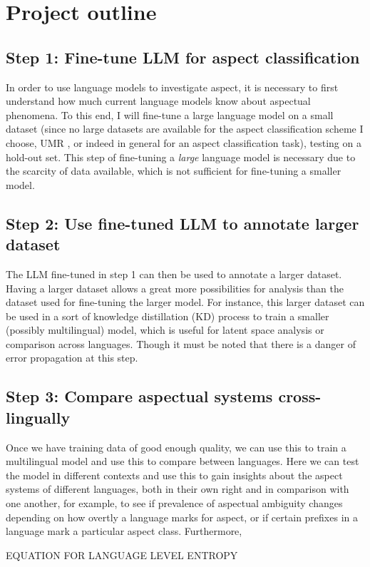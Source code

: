 \section{Project outline}
\subsection*{Step 1: Fine-tune LLM for aspect classification}
In order to use language models to investigate aspect, it is necessary to first understand how much current language models know about aspectual phenomena. To this end, I will fine-tune a large language model on a small dataset (since no large datasets are available for the aspect classification scheme I choose, UMR \citep{umr}, or indeed in general for an aspect classification task), testing on a hold-out set. This step of fine-tuning a \emph{large} language model is necessary due to the scarcity of data available, which is not sufficient for fine-tuning a smaller model.
\subsection*{Step 2: Use fine-tuned LLM to annotate larger dataset}
The LLM fine-tuned in step 1 can then be used to annotate a larger dataset. Having a larger dataset allows a great more possibilities for analysis than the dataset used for fine-tuning the larger model. For instance, this larger dataset can be used in a sort of knowledge distillation (KD) process to train a smaller (possibly multilingual) model, which is useful for latent space analysis or comparison across languages. Though it must be noted that there is a danger of error propagation at this step.
\subsection*{Step 3: Compare aspectual systems cross-lingually}
Once we have training data of good enough quality, we can use this to train a multilingual model and use this to compare between languages. Here we can test the model in different contexts and use this to gain insights about the aspect systems of different languages, both in their own right and in comparison with one another, for example, to see if prevalence of aspectual ambiguity changes depending on how overtly a language marks for aspect, or if certain prefixes in a language mark a particular aspect class. Furthermore, 

EQUATION FOR LANGUAGE LEVEL ENTROPY

